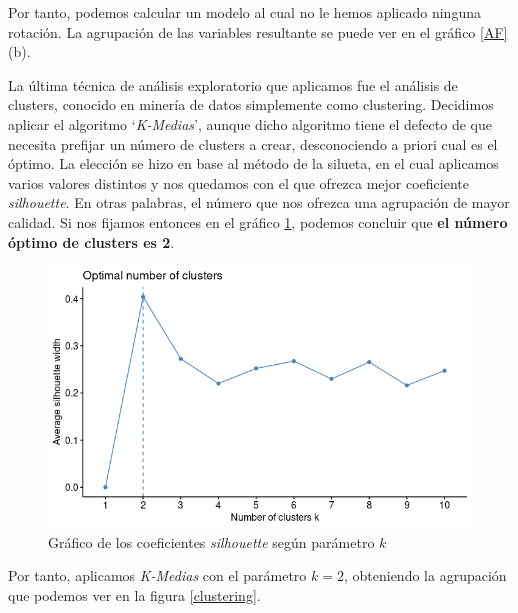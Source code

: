 \documentclass[letterpaper,11pt]{article}
\begin{document}
Por tanto, podemos calcular un modelo al cual no le hemos aplicado ninguna rotación. La agrupación de las variables resultante se puede ver en el gráfico \ref{AF} (b).

La última técnica de análisis exploratorio que aplicamos fue el análisis de clusters, conocido en minería de datos simplemente como clustering. Decidimos aplicar el algoritmo `\textit{K-Medias}', aunque dicho algoritmo tiene el defecto de que necesita prefijar un número de clusters a crear, desconociendo a priori cual es el óptimo. La elección se hizo en base al método de la silueta, en el cual aplicamos varios valores distintos y nos quedamos con el que ofrezca mejor coeficiente \textit{silhouette}. En otras palabras, el número que nos ofrezca una agrupación de mayor calidad. Si nos fijamos entonces en el gráfico \ref{silhouette}, podemos concluir que \textbf{el número óptimo de clusters es 2}.

\begin{figure}
\begin{center}
\includegraphics[scale=0.4]{./img/silhouette.png}
\end{center}
\caption{Gráfico de los coeficientes \textit{silhouette} según parámetro $k$}
\label{silhouette}
\end{figure}

\newpage

Por tanto, aplicamos \textit{K-Medias} con el parámetro $k=2$, obteniendo la agrupación que podemos ver en la figura \ref{clustering}.
\end{document}
